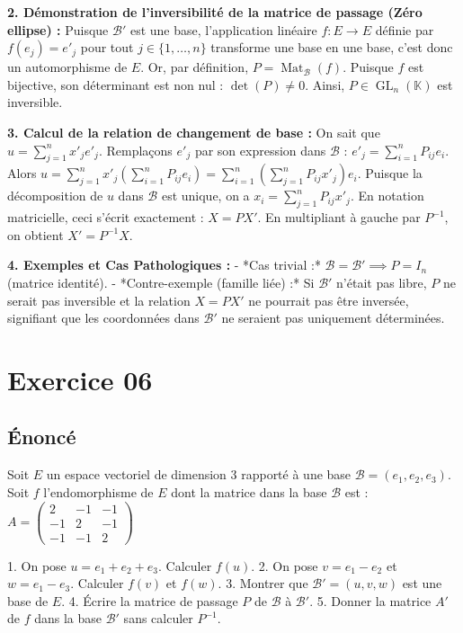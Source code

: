 \documentclass{report}
\begin{document}
\textbf{2. Démonstration de l'inversibilité de la matrice de passage (Zéro ellipse) :}
Puisque $\mathcal{B}'$ est une base, l'application linéaire $f : E \to E$ définie par $f(e_j) = e'_j$ pour tout $j \in \{1, \dots, n\}$ transforme une base en une base, c'est donc un automorphisme de $E$.
Or, par définition, $P = \operatorname{Mat}_{\mathcal{B}}(f)$.
Puisque $f$ est bijective, son déterminant est non nul : $\det(P) \neq 0$.
Ainsi, $P \in \operatorname{GL}_n(\mathbb{K})$ est inversible.

\textbf{3. Calcul de la relation de changement de base :}
On sait que $u = \sum_{j=1}^n x'_j e'_j$.
Remplaçons $e'_j$ par son expression dans $\mathcal{B}$ : $e'_j = \sum_{i=1}^n P_{ij} e_i$.
Alors $u = \sum_{j=1}^n x'_j \left( \sum_{i=1}^n P_{ij} e_i \right) = \sum_{i=1}^n \left( \sum_{j=1}^n P_{ij} x'_j \right) e_i$.
Puisque la décomposition de $u$ dans $\mathcal{B}$ est unique, on a $x_i = \sum_{j=1}^n P_{ij} x'_j$.
En notation matricielle, ceci s'écrit exactement : $X = P X'$.
En multipliant à gauche par $P^{-1}$, on obtient $X' = P^{-1} X$.

\textbf{4. Exemples et Cas Pathologiques :}
- *Cas trivial :* $\mathcal{B} = \mathcal{B}' \implies P = I_n$ (matrice identité).
- *Contre-exemple (famille liée) :* Si $\mathcal{B}'$ n'était pas libre, $P$ ne serait pas inversible et la relation $X = P X'$ ne pourrait pas être inversée, signifiant que les coordonnées dans $\mathcal{B}'$ ne seraient pas uniquement déterminées.


\section*{Exercice 06}
\subsection*{Énoncé}
Soit $E$ un espace vectoriel de dimension 3 rapporté à une base $\mathcal{B} = (e_1, e_2, e_3)$.
Soit $f$ l'endomorphisme de $E$ dont la matrice dans la base $\mathcal{B}$ est :
$A = \begin{pmatrix} 2 & -1 & -1 \\ -1 & 2 & -1 \\ -1 & -1 & 2 \end{pmatrix}$

1. On pose $u = e_1 + e_2 + e_3$. Calculer $f(u)$.
2. On pose $v = e_1 - e_2$ et $w = e_1 - e_3$. Calculer $f(v)$ et $f(w)$.
3. Montrer que $\mathcal{B}' = (u, v, w)$ est une base de $E$.
4. Écrire la matrice de passage $P$ de $\mathcal{B}$ à $\mathcal{B}'$.
5. Donner la matrice $A'$ de $f$ dans la base $\mathcal{B}'$ sans calculer $P^{-1}$.
\end{document}
